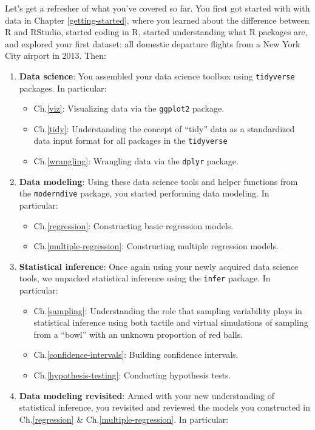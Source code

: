 \documentclass[12pt, krantz2,]{krantz}
\providecommand{\tightlist}{%
  \setlength{\itemsep}{0pt}\setlength{\parskip}{0pt}}
\begin{document}
Let's get a refresher of what you've covered so far. You first got started with with data in Chapter \ref{getting-started}, where you learned about the difference between R and RStudio, started coding in R, started understanding what R packages are, and explored your first dataset: all domestic departure flights from a New York City airport in 2013. Then:

\begin{enumerate}
\def\labelenumi{\arabic{enumi}.}
\tightlist
\item
  \textbf{Data science}: You assembled your data science toolbox using \texttt{tidyverse} packages. In particular:

  \begin{itemize}
  \tightlist
  \item
    Ch.\ref{viz}: Visualizing data via the \texttt{ggplot2} package.
  \item
    Ch.\ref{tidy}: Understanding the concept of ``tidy'' data as a standardized data input format for all packages in the \texttt{tidyverse}
  \item
    Ch.\ref{wrangling}: Wrangling data via the \texttt{dplyr} package.
  \end{itemize}
\item
  \textbf{Data modeling}: Using these data science tools and helper functions from the \texttt{moderndive} package, you started performing data modeling. In particular:

  \begin{itemize}
  \tightlist
  \item
    Ch.\ref{regression}: Constructing basic regression models.
  \item
    Ch.\ref{multiple-regression}: Constructing multiple regression models.
  \end{itemize}
\item
  \textbf{Statistical inference}: Once again using your newly acquired data science tools, we unpacked statistical inference using the \texttt{infer} package. In particular:

  \begin{itemize}
  \tightlist
  \item
    Ch.\ref{sampling}: Understanding the role that sampling variability plays in statistical inference using both tactile and virtual simulations of sampling from a ``bowl'' with an unknown proportion of red balls.
  \item
    Ch.\ref{confidence-intervals}: Building confidence intervals.
  \item
    Ch.\ref{hypothesis-testing}: Conducting hypothesis tests.
  \end{itemize}
\item
  \textbf{Data modeling revisited}: Armed with your new understanding of statistical inference, you revisited and reviewed the models you constructed in Ch.\ref{regression} \& Ch.\ref{multiple-regression}. In particular:


\end{enumerate}
\end{document}
